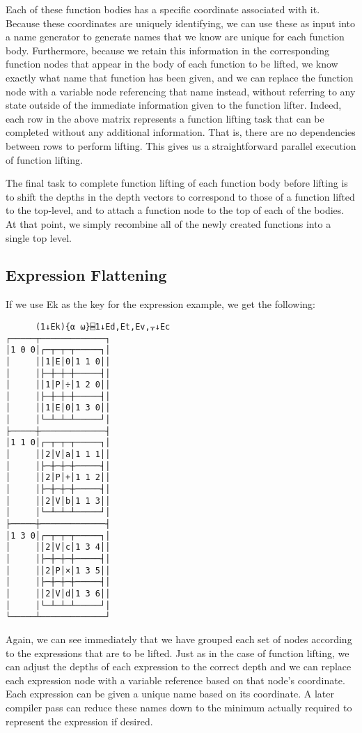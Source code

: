 \documentclass[numbers,preprint]{sigplanconf}
\begin{document}
Each of these function bodies has a specific coordinate associated
with it. Because these coordinates are uniquely identifying, we can
use these as input into a name generator to generate names that we
know are unique for each function body. Furthermore, because we
retain this information in the corresponding function nodes that
appear in the body of each function to be lifted, we know exactly
what name that function has been given, and we can replace the
function node with a variable node referencing that name instead,
without referring to any state outside of the immediate information
given to the function lifter. Indeed, each row in the above matrix
represents a function lifting task that can be completed without any
additional information. That is, there are no dependencies between
rows to perform lifting. This gives us a straightforward parallel
execution of function lifting.

The final task to complete function lifting of each function
body before lifting is to shift the depths in the depth vectors
to correspond to those of a function lifted to the top-level, and
to attach a function node to the top of each of the bodies. At that
point, we simply recombine all of the newly created functions into
a single top level.

\subsection{Expression Flattening}

If we use Ek as the key for the expression example, we get the
following:

\begin{verbatim}
      (1↓Ek){⍺ ⍵}⌸1↓Ed,Et,Ev,⍪↓Ec
┌─────┬─────────────┐
│1 0 0│┌─┬─┬─┬─────┐│
│     ││1│E│0│1 1 0││
│     │├─┼─┼─┼─────┤│
│     ││1│P│÷│1 2 0││
│     │├─┼─┼─┼─────┤│
│     ││1│E│0│1 3 0││
│     │└─┴─┴─┴─────┘│
├─────┼─────────────┤
│1 1 0│┌─┬─┬─┬─────┐│
│     ││2│V│a│1 1 1││
│     │├─┼─┼─┼─────┤│
│     ││2│P│+│1 1 2││
│     │├─┼─┼─┼─────┤│
│     ││2│V│b│1 1 3││
│     │└─┴─┴─┴─────┘│
├─────┼─────────────┤
│1 3 0│┌─┬─┬─┬─────┐│
│     ││2│V│c│1 3 4││
│     │├─┼─┼─┼─────┤│
│     ││2│P│×│1 3 5││
│     │├─┼─┼─┼─────┤│
│     ││2│V│d│1 3 6││
│     │└─┴─┴─┴─────┘│
└─────┴─────────────┘
\end{verbatim}

Again, we can see immediately that we have grouped each set of nodes
according to the expressions that are to be lifted. Just as in the
case of function lifting, we can adjust the depths of each expression
to the correct depth and we can replace each expression node with a
variable reference based on that node’s coordinate. Each expression
can be given a unique name based on its coordinate. A later compiler
pass can reduce these names down to the minimum actually required to
represent the expression if desired.
\end{document}
